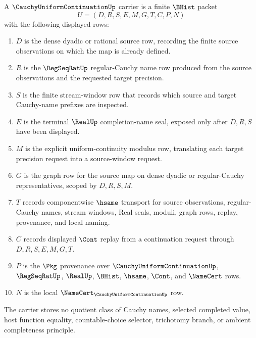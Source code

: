 \begin{definition}
\label{def:cauchy-uniform-continuation-carrier}
A $\CauchyUniformContinuationUp$ carrier is a finite $\BHist$ packet
$$
U=(D,R,S,E,M,G,T,C,P,N)
$$
with the following displayed rows:
\begin{enumerate}
\item $D$ is the dense dyadic or rational source row, recording the finite source observations on which the map is already defined.
\item $R$ is the $\RegSeqRatUp$ regular-Cauchy name row produced from the source observations and the requested target precision.
\item $S$ is the finite stream-window row that records which source and target Cauchy-name prefixes are inspected.
\item $E$ is the terminal $\RealUp$ completion-name seal, exposed only after $D,R,S$ have been displayed.
\item $M$ is the explicit uniform-continuity modulus row, translating each target precision request into a source-window request.
\item $G$ is the graph row for the source map on dense dyadic or regular-Cauchy representatives, scoped by $D,R,S,M$.
\item $T$ records componentwise $\hsame$ transport for source observations, regular-Cauchy names, stream windows, Real seals, moduli, graph rows, replay, provenance, and local naming.
\item $C$ records displayed $\Cont$ replay from a continuation request through $D,R,S,E,M,G,T$.
\item $P$ is the $\Pkg$ provenance over $\CauchyUniformContinuationUp$, $\RegSeqRatUp$, $\RealUp$, $\BHist$, $\hsame$, $\Cont$, and $\NameCert$ rows.
\item $N$ is the local $\NameCert_{\CauchyUniformContinuationUp}$ row.
\end{enumerate}
The carrier stores no quotient class of Cauchy names, selected completed value, host function equality, countable-choice selector, trichotomy branch, or ambient completeness principle.
\end{definition}


